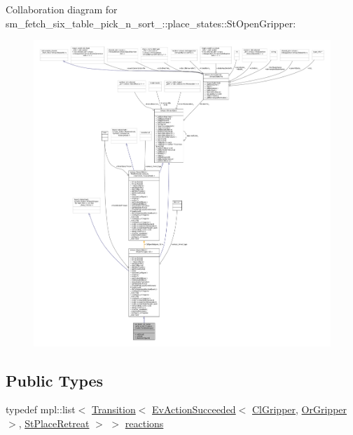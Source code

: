 Collaboration diagram for sm\+\_\+fetch\+\_\+six\+\_\+table\+\_\+pick\+\_\+n\+\_\+sort\+\_\+:\+:place\+\_\+states\+:\+:St\+Open\+Gripper\+:
\nopagebreak
\begin{figure}[H]
\begin{center}
\leavevmode
\includegraphics[width=350pt]{structsm__fetch__six__table__pick__n__sort__1_1_1place__states_1_1StOpenGripper__coll__graph}
\end{center}
\end{figure}
\subsection*{Public Types}
\begin{DoxyCompactItemize}
\item 
typedef mpl\+::list$<$ \hyperlink{classsmacc_1_1Transition}{Transition}$<$ \hyperlink{structsmacc_1_1default__events_1_1EvActionSucceeded}{Ev\+Action\+Succeeded}$<$ \hyperlink{classsm__fetch__six__table__pick__n__sort__1_1_1cl__gripper_1_1ClGripper}{Cl\+Gripper}, \hyperlink{classsm__fetch__six__table__pick__n__sort__1_1_1OrGripper}{Or\+Gripper} $>$, \hyperlink{structsm__fetch__six__table__pick__n__sort__1_1_1place__states_1_1StPlaceRetreat}{St\+Place\+Retreat} $>$ $>$ \hyperlink{structsm__fetch__six__table__pick__n__sort__1_1_1place__states_1_1StOpenGripper_a49f9a5e52b6e2492a9bc3c3a0cb36297}{reactions}
\end{DoxyCompactItemize}
